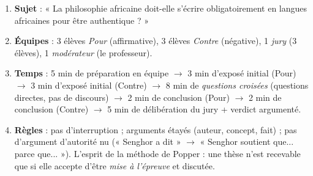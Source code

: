 \documentclass[11pt]{article}
\begin{document}
\begin{methode}
\begin{enumerate}
\item \textbf{Sujet} : « La philosophie africaine doit-elle s'écrire obligatoirement en langues africaines pour être authentique ? »
\item \textbf{Équipes} : 3 élèves \emph{Pour} (affirmative), 3 élèves \emph{Contre} (négative), 1 \emph{jury} (3 élèves), 1 \emph{modérateur} (le professeur).
\item \textbf{Temps} : 5 min de préparation en équipe $\rightarrow$ 3 min d'exposé initial (Pour) $\rightarrow$ 3 min d'exposé initial (Contre) $\rightarrow$ 8 min de \emph{questions croisées} (questions directes, pas de discours) $\rightarrow$ 2 min de conclusion (Pour) $\rightarrow$ 2 min de conclusion (Contre) $\rightarrow$ 5 min de délibération du jury + verdict argumenté.
\item \textbf{Règles} : pas d'interruption ; arguments étayés (auteur, concept, fait) ; pas d'argument d'autorité nu (« Senghor a dit » $\rightarrow$ « Senghor soutient que... parce que... »). L'esprit de la méthode de Popper : une thèse n'est recevable que si elle accepte d'être \emph{mise à l'épreuve} et discutée.
\end{enumerate}
\end{methode}
\end{document}
